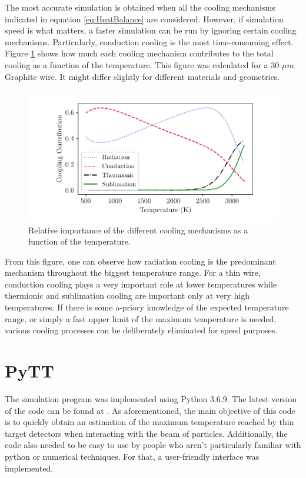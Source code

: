 The most accurate simulation is obtained when all the cooling mechanisms indicated in equation \ref{eq:HeatBalance} are considered. However, if simulation speed is what matters, a faster simulation can be run by ignoring certain cooling mechanisms. Particularly, conduction cooling is the most time-consuming effect. Figure \ref{fig:CoolingComparison} shows how much each cooling mechanism contributes to the total cooling as a function of the temperature. This figure was calculated for a 30 $\mu m$ Graphite wire. It might differ slightly for different materials and geometries. 

\begin{figure}[h]
    \centering
    \includegraphics[width=1.0\columnwidth]{PlotCoolingImportancfe/CoolingImpo.pdf}
    \caption{Relative importance of the different cooling mechanisms as a function of the temperature.}
    \label{fig:CoolingComparison}
\end{figure}

From this figure, one can observe how radiation cooling is the predominant mechanism throughout the biggest temperature range. For a thin wire, conduction cooling plays a very important role at lower temperatures while thermionic and sublimation cooling are important only at very high temperatures. If there is some a-priory knowledge of the expected temperature range, or simply a fast upper limit of the maximum temperature is needed, various cooling processes can be deliberately eliminated for speed purposes.

\section{PyTT}
\label{sec:GUI}

The simulation program was implemented using Python 3.6.9. The latest version of the code can be found at \parencite[][]{ref:GitAra}. As aforementioned, the main objective of this code is to quickly obtain an estimation of the maximum temperature reached by thin target detectors when interacting with the beam of particles. Additionally, the code also needed to be easy to use by people who aren't particularly familiar with python or numerical techniques. For that, a user-friendly interface was implemented.

